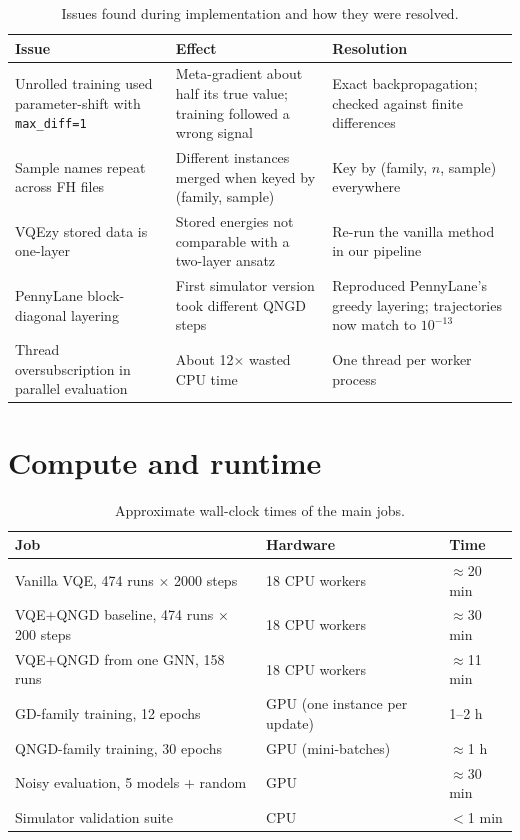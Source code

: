 \documentclass{ssnreview}
\begin{document}
\begin{table}[H]
\centering
\caption{Issues found during implementation and how they were resolved.}\label{tab:issues}
\small
\begin{tabularx}{\textwidth}{L{4.0cm}YL{4.0cm}}
\toprule
Issue & Effect & Resolution \\
\midrule
Unrolled training used parameter-shift with \texttt{max\_diff=1} & Meta-gradient about half its true value; training followed a wrong signal & Exact backpropagation; checked against finite differences \\
Sample names repeat across FH files & Different instances merged when keyed by (family, sample) & Key by (family, $n$, sample) everywhere \\
VQEzy stored data is one-layer & Stored energies not comparable with a two-layer ansatz & Re-run the vanilla method in our pipeline \\
PennyLane block-diagonal layering & First simulator version took different QNGD steps & Reproduced PennyLane's greedy layering; trajectories now match to $10^{-13}$ \\
Thread oversubscription in parallel evaluation & About 12$\times$ wasted CPU time & One thread per worker process \\
\bottomrule
\end{tabularx}
\end{table}

\section{Compute and runtime}

\begin{table}[H]
\centering
\caption{Approximate wall-clock times of the main jobs.}\label{tab:runtime}
\begin{tabular}{lll}
\toprule
Job & Hardware & Time \\
\midrule
Vanilla VQE, 474 runs $\times$ 2000 steps & 18 CPU workers & $\approx$20 min \\
VQE+QNGD baseline, 474 runs $\times$ 200 steps & 18 CPU workers & $\approx$30 min \\
VQE+QNGD from one GNN, 158 runs & 18 CPU workers & $\approx$11 min \\
GD-family training, 12 epochs & GPU (one instance per update) & 1--2 h \\
QNGD-family training, 30 epochs & GPU (mini-batches) & $\approx$1 h \\
Noisy evaluation, 5 models + random & GPU & $\approx$30 min \\
Simulator validation suite & CPU & $<$1 min \\
\bottomrule
\end{tabular}
\end{table}
\end{document}
